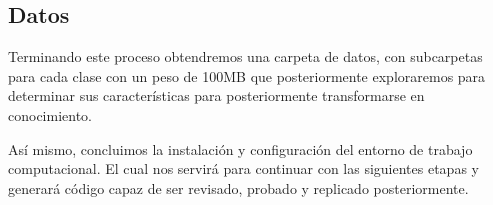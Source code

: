 \subsection{Datos}

Terminando este proceso obtendremos una carpeta de datos, con subcarpetas para
cada clase con un peso de 100MB que posteriormente exploraremos para determinar
sus características para posteriormente transformarse en conocimiento.

Así mismo, concluimos la instalación y configuración del entorno de trabajo
computacional. El cual nos servirá para continuar con las siguientes etapas y
generará código capaz de ser revisado, probado y replicado posteriormente. 